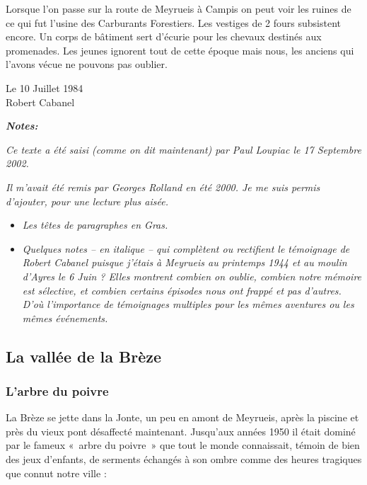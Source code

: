 Lorsque l’on passe sur la route de Meyrueis à Campis on peut voir les ruines de ce qui fut
l’usine des Carburants Forestiers. Les vestiges de 2 fours subsistent encore. Un corps de
bâtiment sert d’écurie pour les chevaux destinés aux promenades. Les jeunes ignorent tout de
cette époque mais nous, les anciens qui l’avons vécue ne pouvons pas oublier.

\begin{flushright}
Le 10 Juillet 1984\\
Robert Cabanel
\end{flushright}


\textit{\textbf{Notes:}}

\textit{Ce texte a été saisi (comme on dit maintenant) par Paul Loupiac le 17 Septembre 2002.}

\textit{Il m’avait été remis par Georges Rolland en été 2000. Je me suis permis d’ajouter, pour une lecture
plus aisée.}


\begin{itemize}
\item \textit{Les têtes de paragraphes en Gras.}
\item \textit{Quelques notes -- en italique -- qui complètent ou rectifient le témoignage de Robert Cabanel puisque
j’étais à Meyrueis au printemps 1944 et au moulin d’Ayres le 6 Juin ? Elles montrent combien on
oublie, combien notre mémoire est sélective, et combien certains épisodes nous ont frappé et pas
d’autres. D’où l’importance de témoignages multiples pour les mêmes aventures ou les mêmes
événements.}
\end{itemize}

\newpage

\subsection{La  vallée de la Brèze}

\subsubsection{L'arbre du poivre}

La Brèze se jette dans la Jonte, un peu en amont de Meyrueis, après la piscine et près du
vieux pont désaffecté maintenant. Jusqu’aux années 1950 il était dominé par le fameux «~arbre
du poivre~» que tout le monde connaissait, témoin de bien des jeux d’enfants, de serments
échangés à son ombre comme des heures tragiques que connut notre ville :

\vspace{10mm}

